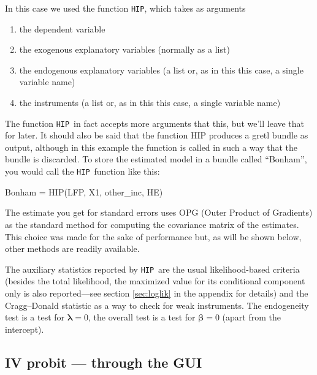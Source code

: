 \documentclass[a4paper,10pt]{article}
\newcommand{\HIP}{\texttt{HIP}}
\newcommand{\ProbitPar}{\bm{\beta}}
\newcommand{\Covars}{\bm{\lambda}}
\begin{document}
In this case we used the function \texttt{HIP}, which takes as
arguments
\begin{enumerate}
\item the dependent variable
\item the exogenous explanatory variables (normally as a list)
\item the endogenous explanatory variables (a list or, as in this this
  case, a single variable name)
\item the instruments (a list or, as in this this case, a single
  variable name)
\end{enumerate}

The function \HIP\ in fact accepts more arguments that this, but we'll
leave that for later. It should also be said that the function HIP
produces a gretl bundle as output, although in this example the
function is called in such a way that the bundle is discarded.  To
store the estimated model in a bundle called ``Bonham'', you would
call the \HIP\ function like this:
\begin{code}
  Bonham = HIP(LFP, X1, other_inc, HE)
\end{code}

The estimate you get for standard errors uses OPG (Outer Product
of Gradients) as the standard method for computing the covariance
matrix of the estimates. This choice was made for the sake of
performance but, as will be shown below, other methods are readily
available.

The auxiliary statistics reported by \HIP\ are the usual
likelihood-based criteria (besides the total likelihood, the maximized
value for its conditional component only is also reported---see
section \ref{sec:loglik} in the appendix for details) and the
Cragg--Donald statistic as a way to check for weak instruments. The
endogeneity test is a test for $\Covars = 0$, the overall test is a
test for $\ProbitPar = 0$ (apart from the intercept).


\subsection{IV probit --- through the GUI}
\end{document}

